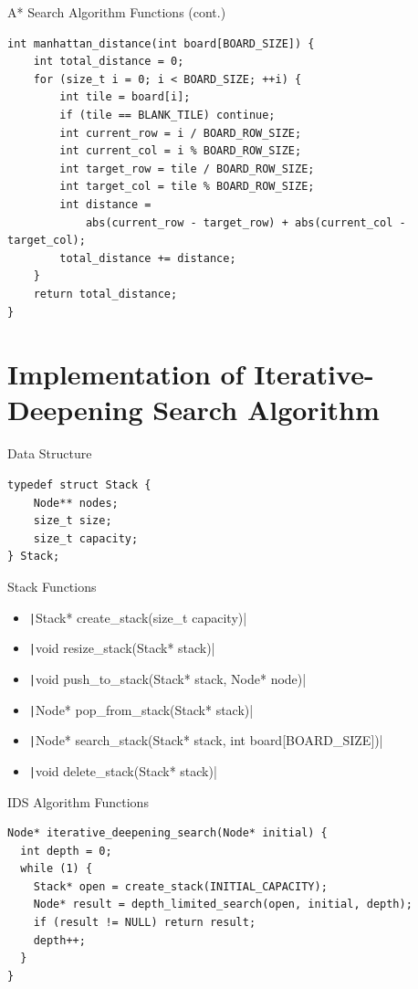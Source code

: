 \documentclass{oxblue-beamer}
\begin{document}
\begin{frame}[fragile]{A* Search Algorithm Functions (cont.)}
\begin{verbatim}
int manhattan_distance(int board[BOARD_SIZE]) {
    int total_distance = 0;
    for (size_t i = 0; i < BOARD_SIZE; ++i) {
        int tile = board[i];
        if (tile == BLANK_TILE) continue;
        int current_row = i / BOARD_ROW_SIZE;
        int current_col = i % BOARD_ROW_SIZE;
        int target_row = tile / BOARD_ROW_SIZE;
        int target_col = tile % BOARD_ROW_SIZE;
        int distance =
            abs(current_row - target_row) + abs(current_col - target_col);
        total_distance += distance;
    }
    return total_distance;
}
\end{verbatim}
\end{frame}

\section{Implementation of Iterative-Deepening Search Algorithm}

\begin{frame}[fragile]{Data Structure}
\begin{verbatim}
typedef struct Stack {
    Node** nodes;
    size_t size;
    size_t capacity;
} Stack;
\end{verbatim}
\end{frame}

\begin{frame}{Stack Functions}
\begin{itemize}
    \item \texttt|Stack* create_stack(size_t capacity)|
    \item \texttt|void resize_stack(Stack* stack)|
    \item \texttt|void push_to_stack(Stack* stack, Node* node)|
    \item \texttt|Node* pop_from_stack(Stack* stack)|
    \item \texttt|Node* search_stack(Stack* stack, int board[BOARD_SIZE])|
    \item \texttt|void delete_stack(Stack* stack)|
\end{itemize}
\end{frame}

\begin{frame}[fragile]{IDS Algorithm Functions}
\begin{verbatim}
Node* iterative_deepening_search(Node* initial) {
  int depth = 0;
  while (1) {
    Stack* open = create_stack(INITIAL_CAPACITY);
    Node* result = depth_limited_search(open, initial, depth);
    if (result != NULL) return result;
    depth++;
  }
}
\end{verbatim}
\end{frame}
\end{document}
